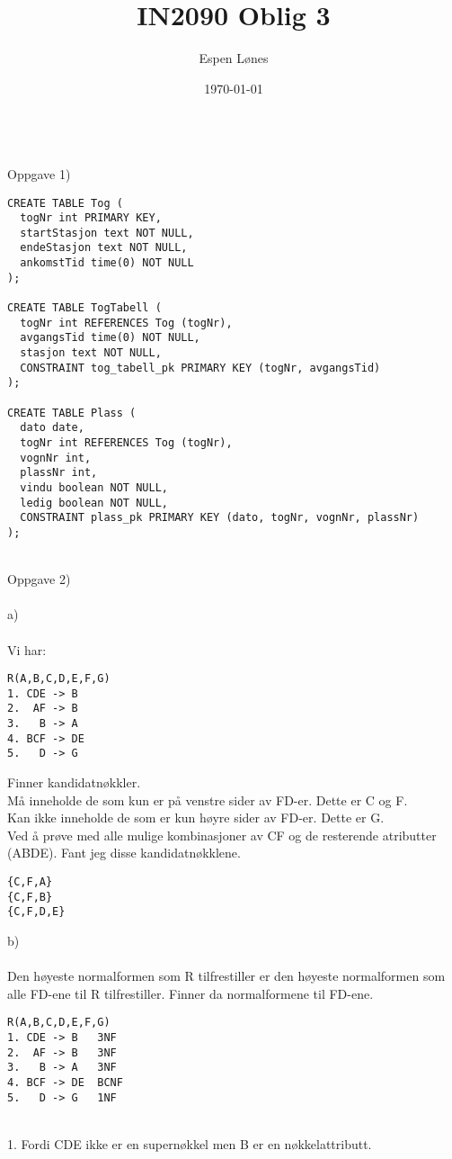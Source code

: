 \documentclass[12pt, letterpaper, twoside]{article}
\begin{document}
\title{IN2090 Oblig 3}
\author{Espen Lønes}
\date{\today}
\maketitle
\ \\
Oppgave 1)\\
\begin{verbatim}
CREATE TABLE Tog (
  togNr int PRIMARY KEY,
  startStasjon text NOT NULL,
  endeStasjon text NOT NULL,
  ankomstTid time(0) NOT NULL
);

CREATE TABLE TogTabell (
  togNr int REFERENCES Tog (togNr), 
  avgangsTid time(0) NOT NULL, 
  stasjon text NOT NULL,
  CONSTRAINT tog_tabell_pk PRIMARY KEY (togNr, avgangsTid)
);

CREATE TABLE Plass (
  dato date, 
  togNr int REFERENCES Tog (togNr), 
  vognNr int,
  plassNr int,
  vindu boolean NOT NULL,
  ledig boolean NOT NULL,
  CONSTRAINT plass_pk PRIMARY KEY (dato, togNr, vognNr, plassNr)
);
\end{verbatim}
\newpage
\ \\
Oppgave 2)\\
\ \\
a)\\
\\
Vi har:
\begin{verbatim}
R(A,B,C,D,E,F,G)
1. CDE -> B
2.  AF -> B
3.   B -> A
4. BCF -> DE
5.   D -> G
\end{verbatim}
Finner kandidatnøkkler.\\
Må inneholde de som kun er på venstre sider av FD-er. Dette er C og F.\\
Kan ikke inneholde de som er kun høyre sider av FD-er. Dette er G.\\
Ved å prøve med alle mulige kombinasjoner av CF og de resterende atributter (ABDE). Fant jeg disse kandidatnøkklene.
\begin{verbatim}
{C,F,A}
{C,F,B}
{C,F,D,E}
\end{verbatim}
b)\\ 
\ \\
Den høyeste normalformen som R tilfrestiller er den høyeste normalformen som alle FD-ene til R tilfrestiller. Finner da normalformene til FD-ene.
\begin{verbatim}
R(A,B,C,D,E,F,G)
1. CDE -> B   3NF 
2.  AF -> B   3NF
3.   B -> A   3NF
4. BCF -> DE  BCNF
5.   D -> G   1NF
\end{verbatim}
\newpage
\ \\
1. Fordi CDE ikke er en supernøkkel men B er en nøkkelattributt.\\
\end{document}
